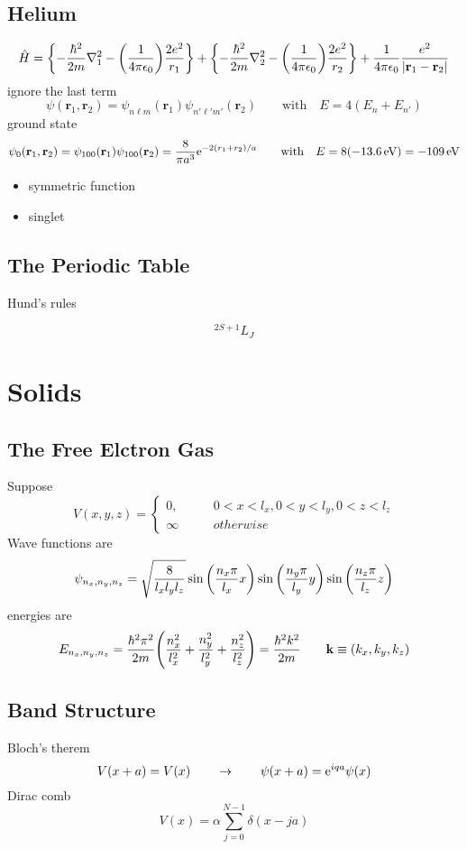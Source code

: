 \subsection{Helium}
\[\hat{H}=\qty{ - \frac{\hbar^2}{2m}\nabla^2_1 - 
                \qty(\frac{1}{4\pi\epsilon_0})\frac{2e^2}{r_1}} + \qty{ - \frac{\hbar^2}{2m}\nabla^2_2 - 
                \qty(\frac{1}{4\pi\epsilon_0})\frac{2e^2}{r_2}} 
				   + \frac{1}{4\pi\epsilon_0} \frac{e^2}{|\mathbf{r}_1 - \mathbf{r}_2|}\]
ignore the last term 
\[\psi(\mathbf{r}_1,\mathbf{r}_2)=\psi_{n\ell m}(\mathbf{r}_1)\psi_{n'\ell' m'}(\mathbf{r}_2)\qquad\text{with}\quad E=4(E_n+E_{n'})\]
ground state
\[\psi_0(\mathbf{r}_1,\mathbf{r}_2)=\psi_{100}(\mathbf{r}_1)\psi_{100}(\mathbf{r}_2)=\frac{8}{\pi a^3}{\rm e}^{-2(r_1+r_2)/a}
\qquad\text{with}\quad E=8(-13.6\,{\rm eV})=-109\,{\rm eV}\]
\begin{itemize}
	\item symmetric function
 \item singlet
\end{itemize}
\subsection{The Periodic Table}
Hund's rules

\[^{2S+1}L_J\]
\section{Solids}

\subsection{The Free Elctron Gas}
Suppose
\[V(x,y,z) = \begin{cases}
	0 ,\qquad & 0<x<l_x,0<y<l_y,0<z<l_z\\
	\infty & otherwise
\end{cases}\] 
Wave functions are 
\[\psi_{n_x,n_y,n_z} = \sqrt{\frac{8}{l_xl_yl_z}}\sin\qty(\frac{n_x\pi}{l_x}x)\sin\qty(\frac{n_y\pi}{l_y}y)\sin\qty(\frac{n_z\pi}{l_z}z)\]
energies are 
\[E_{n_x,n_y,n_z} =\frac{\hbar^2\pi^2}{2m}\qty(\frac{n_x^2}{l_x^2} + \frac{n_y^2}{l_y^2} + \frac{n_z^2}{l_z^2})=\frac{\hbar^2k^2}{2m}\qquad \mathbf{k}\equiv(k_x,k_y,k_z)\]

\subsection{Band Structure}
Bloch's therem 
 \[V(x+a)=V(x) \qquad\rightarrow\qquad \psi(x+a)={\rm e}^{iqa}\psi(x)\]
Dirac comb
\[V(x) = \alpha\sum_{j=0}^{N-1}\delta(x-ja) \]

